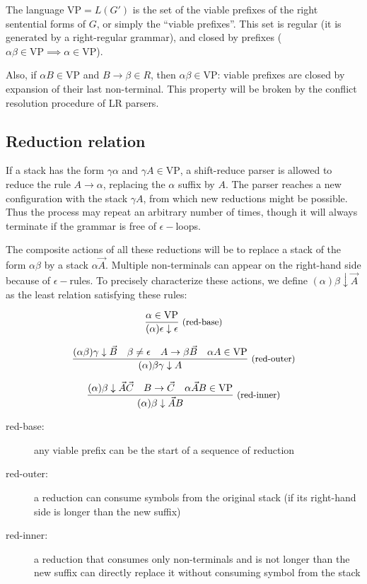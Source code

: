 \documentclass{article}
\begin{document}
\newcommand\VP{\text{VP}}
The language $\VP = L(G')$ is the set of the viable prefixes of the right sentential forms of $G$, or simply the ``viable prefixes''. This set is regular (it is generated by a right-regular grammar), and closed by prefixes ($\alpha\beta \in \VP \implies \alpha \in \VP$).

Also, if $\alpha B \in \VP$ and $B \rightarrow \beta \in R$, then $\alpha\beta \in \VP$: viable prefixes are closed by expansion of their last non-terminal. This property will be broken by the conflict resolution procedure of LR parsers.

\subsection{Reduction relation}

If a stack has the form $\gamma \alpha$ and $\gamma A \in \VP$, a shift-reduce parser is allowed to reduce the rule $A \rightarrow \alpha$, replacing the $\alpha$ suffix by $A$.
The parser reaches a new configuration with the stack $\gamma A$, from which new reductions might be possible. Thus the process may repeat an arbitrary number of times, though it will always terminate if the grammar is free of $\epsilon-$loops.

\newcommand\dred[3]{{(#1) #2 \downarrow #3}}
The composite actions of all these reductions will be to replace a stack of the form $\alpha \beta$ by a stack $\alpha \vec A$. Multiple non-terminals can appear on the right-hand side because of $\epsilon-$rules. To precisely characterize these actions, we define $\dred{\alpha}{\beta}{\vec A}$ as the least relation satisfying these rules:

\newcommand\Rule[3]{\frac{#1}{#2}\text{\small \ (#3)}}

\[\Rule
  {\alpha \in \VP}
  {\dred{\alpha}{\epsilon}{\epsilon}}
  {red-base}
\]

\[\Rule
  {\dred{\alpha\beta}{\gamma}{\vec B}
    \quad \beta \neq \epsilon
    \quad A \rightarrow \beta \vec B
    \quad \alpha A \in \VP}
  {\dred{\alpha}{\beta\gamma}{A}}
  {red-outer}
\]

\[\Rule
  {\dred{\alpha}{\beta}{\vec A \vec C}
    \quad B \rightarrow \vec C
    \quad\alpha \vec A B \in \VP}
  {\dred{\alpha}{\beta}{\vec A B}}
  {red-inner}
\]

\begin{description}
  \item[red-base:] any viable prefix can be the start of a sequence of reduction
  \item[red-outer:] a reduction can consume symbols from the original stack (if its right-hand side is longer than the new suffix)
  \item[red-inner:] a reduction that consumes only non-terminals and is not longer than the new suffix can directly replace it without consuming symbol from the stack
\end{description}
\end{document}
